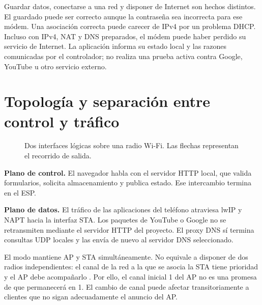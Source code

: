 \documentclass[11pt,a4paper]{article}
\newcommand{\code}[1]{\texttt{\detokenize{#1}}}
\begin{document}
Guardar datos, conectarse a una red y disponer de Internet son hechos
distintos. El guardado puede ser correcto aunque la contraseña sea
incorrecta para ese módem. Una asociación correcta puede carecer de
IPv4 por un problema DHCP. Incluso con IPv4, NAT y DNS preparados, el
módem puede haber perdido su servicio de Internet. La aplicación informa
su estado local y las razones comunicadas por el controlador; no realiza
una prueba activa contra Google, YouTube u otro servicio externo.

\section{Topología y separación entre control y tráfico}
\label{sec:topologia}

\begin{figure}[htbp]
\centering
{}
\caption{Dos interfaces lógicas sobre una radio Wi-Fi. Las flechas representan el recorrido de salida.}
\end{figure}

\textbf{Plano de control.} El navegador habla con el servidor HTTP local,
que valida formularios, solicita almacenamiento y publica estado. Ese
intercambio termina en el ESP.

\textbf{Plano de datos.} El tráfico de las aplicaciones del teléfono
atraviesa lwIP y NAPT hacia la interfaz STA. Los paquetes de YouTube o
Google no se retransmiten mediante el servidor HTTP del proyecto.
El proxy DNS sí termina consultas UDP locales y las envía de nuevo al
servidor DNS seleccionado.

El modo \code{WIFI_MODE_APSTA} mantiene AP y STA simultáneamente. No
equivale a disponer de dos radios independientes: el canal de la red a
la que se asocia la STA tiene prioridad y el AP debe acompañarlo
\cite{wifi}. Por ello, el canal inicial 1 del AP no es una promesa de que
permanecerá en 1. El cambio de canal puede afectar transitoriamente a
clientes que no sigan adecuadamente el anuncio del AP.
\end{document}
